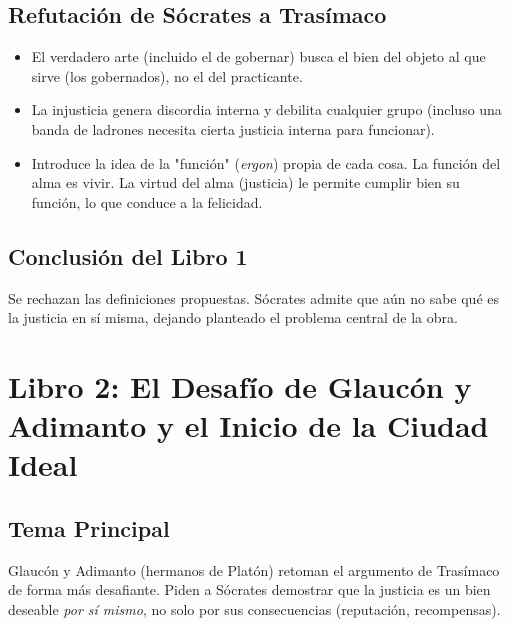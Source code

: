 \documentclass[11pt, a4paper]{article}
\begin{document}
\subsection*{Refutación de Sócrates a Trasímaco}
\begin{itemize}
    \item El verdadero arte (incluido el de gobernar) busca el bien del objeto al que sirve (los gobernados), no el del practicante.
    \item La injusticia genera discordia interna y debilita cualquier grupo (incluso una banda de ladrones necesita cierta justicia interna para funcionar).
    \item Introduce la idea de la "función" (\textit{ergon}) propia de cada cosa. La función del alma es vivir. La virtud del alma (justicia) le permite cumplir bien su función, lo que conduce a la felicidad.
\end{itemize}

\subsection*{Conclusión del Libro 1}
Se rechazan las definiciones propuestas. Sócrates admite que aún no sabe qué es la justicia en sí misma, dejando planteado el problema central de la obra.

\section*{Libro 2: El Desafío de Glaucón y Adimanto y el Inicio de la Ciudad Ideal}

\subsection*{Tema Principal}
Glaucón y Adimanto (hermanos de Platón) retoman el argumento de Trasímaco de forma más desafiante. Piden a Sócrates demostrar que la justicia es un bien deseable \textit{por sí mismo}, no solo por sus consecuencias (reputación, recompensas).
\end{document}
